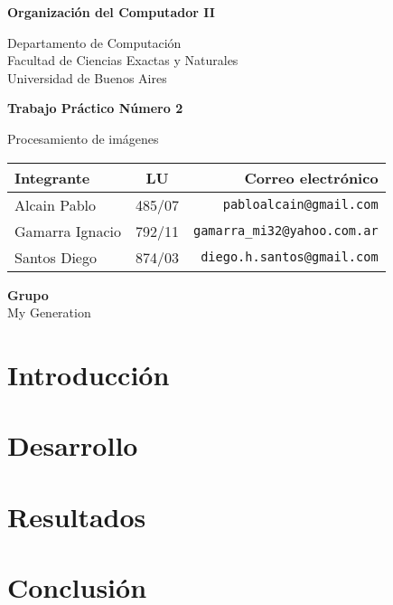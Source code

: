 \documentclass[a4paper,spanish,12pt]{article}
\begin{document}
  \thispagestyle{empty}
  \begin{center}
    {\huge \textbf{Organizaci\'on del Computador II}}\\ \par
    \vspace{15mm}
    {\Large Departamento de Computaci\'on\\
    Facultad de Ciencias Exactas y Naturales \\
    Universidad de Buenos Aires \par}
    \vspace{22mm}
    {\LARGE\textbf{Trabajo Pr\'actico N\'umero 2}}\\
    {\Large Procesamiento de im\'agenes\\
    \vspace{22mm}
    \begin{tabular}{|lcr|}
      \hline
      Integrante & LU & Correo electr\'onico\\
      \hline
      Alcain Pablo & 485/07 & \texttt{pabloalcain@gmail.com}\\
      Gamarra Ignacio & 792/11 & \texttt{gamarra_mi32@yahoo.com.ar}\\
      Santos Diego & 874/03 & \texttt{diego.h.santos@gmail.com}\\
      \hline
    \end{tabular}}
  \end{center}
  \vspace{40mm}
  \begin{center}
    {\Large \textbf{Grupo}}\\ \vspace{12pt}
    {\large My Generation}
  \end{center}
  \pagebreak
 
  \tableofcontents
  \section{Introducción}
    
   \newpage
  \section{Desarrollo}
    
   \newpage
  \section{Resultados}
    
    \newpage
  \section{Conclusión}
    
   \newpage
\end{document}
